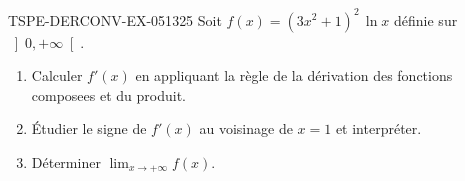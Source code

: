 \begin{exercice}{TSPE-DERCONV-EX-051}{3}{25}
Soit $f(x) = (3x^2 + 1)^2 \, \ln x$ définie sur $\left]0, +\infty\right[$.
\begin{enumerate}
  \item Calculer $f'(x)$ en appliquant la règle de la dérivation des fonctions composees et du produit.
  \item Étudier le signe de $f'(x)$ au voisinage de $x = 1$ et interpréter.
  \item Déterminer $\lim_{x \to +\infty} f(x)$.
\end{enumerate}

\end{exercice}
